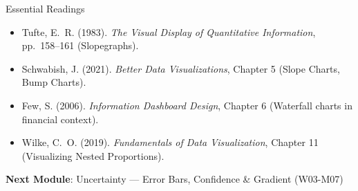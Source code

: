 \documentclass[10pt]{beamer}
\begin{document}
\begin{frame}{Essential Readings}
  \begin{itemize}
    \item Tufte, E.~R. (1983). \emph{The Visual Display of Quantitative
          Information}, pp.\ 158--161 (Slopegraphs).
    \item Schwabish, J. (2021). \emph{Better Data Visualizations},
          Chapter 5 (Slope Charts, Bump Charts).
    \item Few, S. (2006). \emph{Information Dashboard Design},
          Chapter 6 (Waterfall charts in financial context).
    \item Wilke, C.~O. (2019). \emph{Fundamentals of Data Visualization},
          Chapter 11 (Visualizing Nested Proportions).
  \end{itemize}
  \vspace{6pt}
  \textbf{Next Module}: Uncertainty --- Error Bars, Confidence \& Gradient (W03-M07)
\end{frame}
\end{document}
